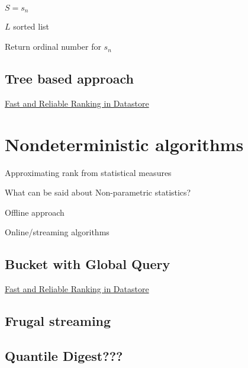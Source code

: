 $ S = { s_n } $

$ L $ sorted list

Return ordinal number for $s_n$

\subsection{Tree based approach}

\href{https://cloud.google.com/datastore/docs/articles/fast-and-reliable-ranking-in-datastore/}{Fast and Reliable Ranking in Datastore} 


\section{Nondeterministic algorithms}

\begin{shaded}
 Approximating rank from statistical measures

 What can be said about Non-parametric statistics?

 Offline approach

 Online/streaming algorithms
\end{shaded}

\subsection{Bucket with Global Query}

\href{https://cloud.google.com/datastore/docs/articles/fast-and-reliable-ranking-in-datastore/}{Fast and Reliable Ranking in Datastore} 


\subsection{Frugal streaming}

\cite{frugal_streaming}

\subsection{Quantile Digest???}

\cite{quantile_digest}
